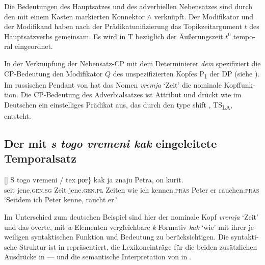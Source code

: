 \documentclass[output=paper, colorlinks, citecolor=brown, booklanguage=german]{langscibook}
\begin{document}
\begin{otherlanguage}{german}
\noindent Die Bedeutungen des Hauptsatzes und des adverbiellen Nebensatzes sind durch den mit einem Kasten markierten Konnektor $\wedge$ verknüpft. Der Modifikator und der Modifikand haben nach der Prädikatunifizierung das Topikzeitargument $t$ des Hauptsatzverbs gemeinsam. Es wird in T bezüglich der Äußerungszeit $t^0$ temporal eingeordnet.

In der Verknüpfung der Nebensatz-CP mit dem Determinierer \textit{dem} spezifiziert die CP-Bedeutung den Modifikator $Q$ des unspezifizierten Kopfes P\textsubscript{1} der DP (siehe ). Im russischen Pendant  von  hat das Nomen \textit{vremja} `Zeit' die nominale Kopffunktion. Die CP-Bedeutung des Adverbialsatzes ist Attribut und drückt wie im Deutschen ein einstelliges Prädikat aus, das durch den type shift , TS\textsubscript{LA}, entsteht.

\subsection{Der mit \textit{s togo vremeni kak} eingeleitete Temporalsatz} \label{subsec:18:3.3}

\begin{exe}
[]{
\gll S \minsp{\{} togo vremeni / tex роr\} kak ja znaju Petra, on kurit.\\
         seit {} jene.\textsc{gen}.\textsc{sg} Zeit {} jene.\textsc{gen}.\textsc{pl}  Zeiten wie ich kennen.\textsc{präs} Peter er rauchen.\textsc{präs}\\
         \glt     ‘Seitdem ich Peter kenne, raucht er.’}
\end{exe}



\noindent Im Unterschied zum deutschen Beispiel  sind hier der nominale Kopf \textit{vremja} `Zeit' und das overte, mit \textit{w}-Elementen vergleichbare \textit{k}-Formativ \textit{kak} ‘wie' mit ihrer jeweiligen syntaktischen Funktion und Bedeutung zu berücksichtigen. Die syntaktische Struktur ist in  repräsentiert, die Lexikoneinträge für die beiden zusätzlichen Ausdrücke in — und die semantische Interpretation von  in .


\end{otherlanguage}
\end{document}
